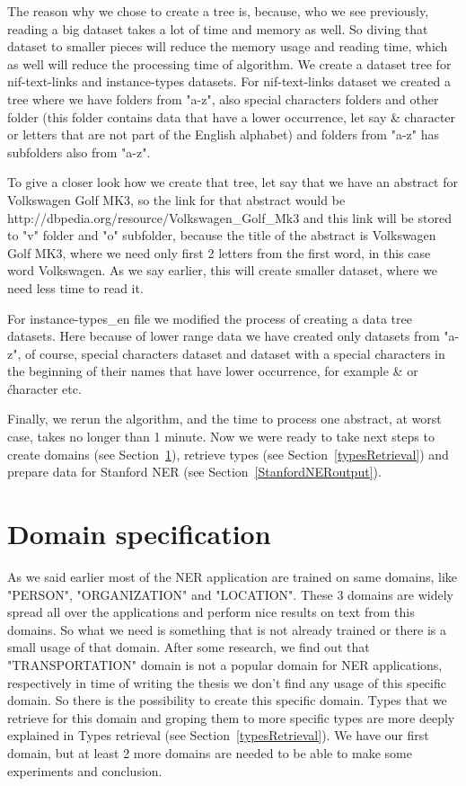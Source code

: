 \documentclass[thesis=M,english]{FITthesis}[2018/05/30]
\begin{document}
	The reason why we chose to create a tree is, because, who we see previously, reading a big dataset takes a lot of time and memory as well. So diving that dataset to smaller pieces will reduce the memory usage and reading time, which as well will reduce the processing time of algorithm. We create a dataset tree for nif-text-links and instance-types datasets. For nif-text-links dataset we created a tree where we have folders from "a-z", also special characters folders and other folder (this folder contains data that have a lower occurrence, let say \& character or letters that are not part of the English alphabet) and folders from "a-z" has subfolders also from "a-z". 

	To give a closer look how we create that tree, let say that we have an abstract for Volkswagen Golf MK3, so the link for that abstract would be http://dbpedia.org/resource/Volkswagen\_Golf\_Mk3 and this link will be stored to "v" folder and "o" subfolder, because the title of the abstract is Volkswagen Golf MK3, where we need only first 2 letters from the first word, in this case word Volkswagen. As we say earlier, this will create smaller dataset, where we need less time to read it.

	For instance-types\_en file we modified the process of creating a data tree datasets. Here because of lower range data we have created only datasets from "a-z", of course, special characters dataset and dataset with a special characters in the beginning of their names that have lower occurrence, for example \& or \' character etc.

	Finally, we rerun the algorithm, and the time to process one abstract, at worst case, takes no longer than 1 minute. Now we were ready to take next steps to create domains (see Section~\ref{domainSpecification}), retrieve types (see Section~\ref{typesRetrieval}) and prepare data for Stanford NER (see Section~\ref{StanfordNERoutput}).

\section{Domain specification}\label{domainSpecification}
	As we said earlier most of the NER application are trained on same domains, like "PERSON", "ORGANIZATION" and "LOCATION". These 3 domains are widely spread all over the applications and perform nice results on text from this domains. So what we need is something that is not already trained or there is a small usage of that domain. After some research, we find out that "TRANSPORTATION" domain is not a popular domain for NER applications, respectively in time of writing the thesis we don't find any usage of this specific domain. So there is the possibility to create this specific domain. Types that we retrieve for this domain and groping them to more specific types are more deeply explained in Types retrieval (see Section~\ref{typesRetrieval}). We have our first domain, but at least 2 more domains are needed to be able to make some experiments and conclusion. 
\end{document}
